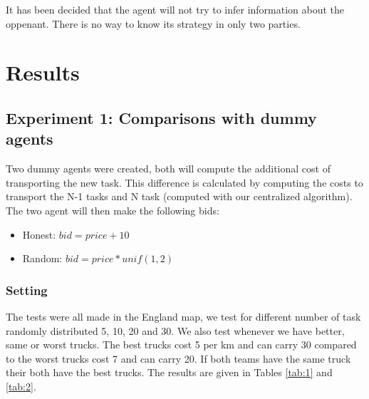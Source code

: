 \documentclass[11pt]{article}
\begin{document}
It has been decided that the agent will not try to infer information about the oppenant. There is no way to know its strategy in only two parties.

\section{Results}

\subsection{Experiment 1: Comparisons with dummy agents}
Two dummy agents were created, both will compute the additional cost of transporting the new task. This difference is calculated by computing the costs to transport the N-1 tasks and N task (computed with our centralized algorithm). The two agent will then make the following bids:
\begin{itemize}
  \item Honest: $bid = price + 10$
  \item Random: $bid = price * unif(1,2)$
\end{itemize}

\subsubsection{Setting}
The tests were all made in the England map, we test for different number of task randomly distributed 5, 10, 20 and 30. We also test whenever we have better, same or worst trucks. The best trucks cost 5 per km and can carry 30 compared to the worst trucks cost 7 and can carry 20. If both teams have the same truck their both have the best trucks. The results are given in Tables \ref{tab:1} and \ref{tab:2}.
\end{document}
